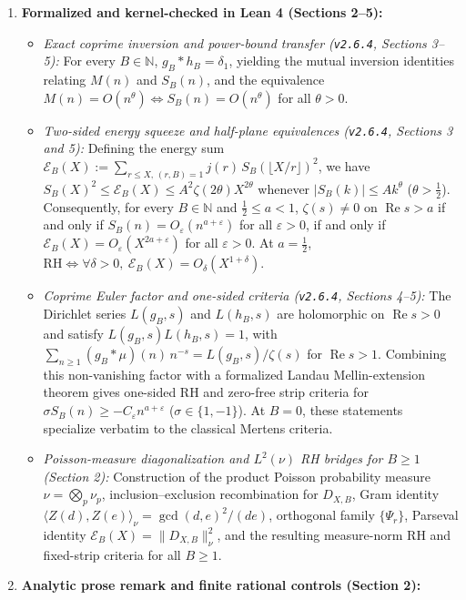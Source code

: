 \documentclass[11pt]{article}
\providecommand{\tightlist}{\setlength{\itemsep}{0pt}\setlength{\parskip}{0pt}}
\begin{document}
\begin{enumerate}
\def\labelenumi{\arabic{enumi}.}
\tightlist
\item
  \textbf{Formalized and kernel-checked in Lean 4 (Sections 2--5):}

  \begin{itemize}
  \tightlist
  \item
    \emph{Exact coprime inversion and power-bound transfer (\texttt{v2.6.4}, Sections 3--5):} For every \(B \in \mathbb{N}\), \(g_B * h_B = \delta_1\), yielding the mutual inversion identities relating \(M(n)\) and \(S_B(n)\), and the equivalence \(M(n) = O(n^\theta) \iff S_B(n) = O(n^\theta)\) for all \(\theta > 0\).
  \item
    \emph{Two-sided energy squeeze and half-plane equivalences (\texttt{v2.6.4}, Sections 3 and 5):} Defining the energy sum \(\mathscr{E}_B(X) := \sum_{r \le X,\, (r,B)=1} j(r)\, S_B(\lfloor X/r \rfloor)^2\), we have \(S_B(X)^2 \le \mathscr{E}_B(X) \le A^2 \zeta(2\theta) X^{2\theta}\) whenever \(|S_B(k)| \le A k^\theta\) (\(\theta > \tfrac{1}{2}\)). Consequently, for every \(B \in \mathbb{N}\) and \(\tfrac{1}{2} \le a < 1\), \(\zeta(s) \neq 0\) on \(\operatorname{Re} s > a\) if and only if \(S_B(n) = O_\varepsilon(n^{a+\varepsilon})\) for all \(\varepsilon > 0\), if and only if \(\mathscr{E}_B(X) = O_\varepsilon(X^{2a+\varepsilon})\) for all \(\varepsilon > 0\). At \(a = \tfrac{1}{2}\), \(\mathrm{RH} \iff \forall \delta > 0,\ \mathscr{E}_B(X) = O_\delta(X^{1+\delta})\).
  \item
    \emph{Coprime Euler factor and one-sided criteria (\texttt{v2.6.4}, Sections 4--5):} The Dirichlet series \(L(g_B, s)\) and \(L(h_B, s)\) are holomorphic on \(\operatorname{Re} s > 0\) and satisfy \(L(g_B, s) L(h_B, s) = 1\), with \(\sum_{n \ge 1} (g_B * \mu)(n)\, n^{-s} = L(g_B, s)/\zeta(s)\) for \(\operatorname{Re} s > 1\). Combining this non-vanishing factor with a formalized Landau Mellin-extension theorem gives one-sided RH and zero-free strip criteria for \(\sigma S_B(n) \ge -C_\varepsilon n^{a+\varepsilon}\) (\(\sigma \in \{1, -1\}\)). At \(B = 0\), these statements specialize verbatim to the classical Mertens criteria.
  \item
    \emph{Poisson-measure diagonalization and \(L^2(\nu)\) RH bridges for \(B \ge 1\) (Section 2):} Construction of the product Poisson probability measure \(\nu = \bigotimes_p \nu_p\), inclusion--exclusion recombination for \(D_{X,B}\), Gram identity \(\langle Z(d), Z(e)\rangle_\nu = \gcd(d,e)^2/(de)\), orthogonal family \(\{\Psi_r\}\), Parseval identity \(\mathscr{E}_B(X) = \|D_{X,B}\|_\nu^2\), and the resulting measure-norm RH and fixed-strip criteria for all \(B \ge 1\).
  \end{itemize}
\item
  \textbf{Analytic prose remark and finite rational controls (Section 2):}


\end{enumerate}
\end{document}
